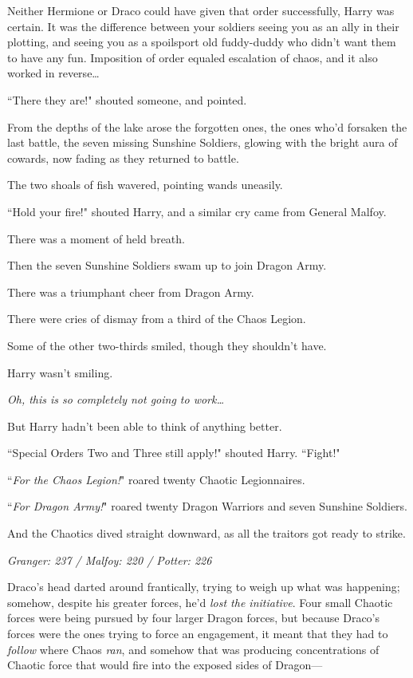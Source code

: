 Neither Hermione or Draco could have given that order successfully, Harry was certain. It was the difference between your soldiers seeing you as an ally in their plotting, and seeing you as a spoilsport old fuddy-duddy who didn't want them to have any fun. Imposition of order equaled escalation of chaos, and it also worked in reverse{\ldots}

``There they are!" shouted someone, and pointed.

From the depths of the lake arose the forgotten ones, the ones who'd forsaken the last battle, the seven missing Sunshine Soldiers, glowing with the bright aura of cowards, now fading as they returned to battle.

The two shoals of fish wavered, pointing wands uneasily.

``Hold your fire!" shouted Harry, and a similar cry came from General Malfoy.

There was a moment of held breath.

Then the seven Sunshine Soldiers swam up to join Dragon Army.

There was a triumphant cheer from Dragon Army.

There were cries of dismay from a third of the Chaos Legion.

Some of the other two-thirds smiled, though they shouldn't have.

Harry wasn't smiling.

\emph{Oh, this is so completely not going to work{\ldots}}

But Harry hadn't been able to think of anything better.

``Special Orders Two and Three still apply!" shouted Harry. ``Fight!"

``\emph{For the Chaos Legion!}" roared twenty Chaotic Legionnaires.

``\emph{For Dragon Army!}" roared twenty Dragon Warriors and seven Sunshine Soldiers.

And the Chaotics dived straight downward, as all the traitors got ready to strike.

\later

\emph{Granger: 237 / Malfoy: 220 / Potter: 226}

Draco's head darted around frantically, trying to weigh up what was happening; somehow, despite his greater forces, he'd \emph{lost the initiative}. Four small Chaotic forces were being pursued by four larger Dragon forces, but because Draco's forces were the ones trying to force an engagement, it meant that they had to \emph{follow} where Chaos \emph{ran}, and somehow that was producing concentrations of Chaotic force that would fire into the exposed sides of Dragon—


